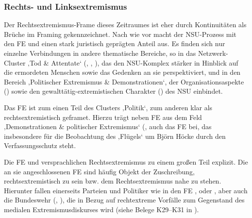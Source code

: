 \subsubsection{Rechts- und Linksextremismus}\label{rechts--und-linksextremismus-6}

Der Rechtsextremismus-Frame dieses Zeitraumes ist eher durch Kontinuitäten als Brüche im Framing gekennzeichnet. Nach wie vor macht der NSU-Prozess mit den FE  und  einen stark juristisch geprägten Anteil aus. Es finden sich nur einzelne Verbindungen in andere thematische Bereiche, so in das Netzwerk-Cluster ‚Tod \& Attentate` (, , ), das den NSU-Komplex stärker in Hinblick auf die ermordeten Menschen sowie das Gedenken an sie perspektiviert, und in den Bereich ‚Politischer Extremismus \& Demonstrationen`, der Organisationsaspekte () sowie den gewalttätig-extremistischen Charakter () des NSU einbindet.

Das FE  ist zum einen Teil des Clusters ‚Politik`, zum anderen klar als rechtsextremistisch geframet. Hierzu trägt neben FE aus dem Feld ‚Demonstrationen \& politischer Extremismus` (,  auch das FE  bei, das insbesondere für die Beobachtung des ‚Flügels` um Björn Höcke durch den Verfassungsschutz steht.

Die FE  und  versprachlichen Rechtsextremismus zu einem großen Teil explizit. Die an sie angeschlossenen FE sind häufig Objekt der Zuschreibung, rechtsextremistisch zu sein bzw. dem Rechtsextremismus nahe zu stehen. Hierunter fallen einerseits Parteien und Politiker wie in den FE ,  oder , aber auch die Bundeswehr (, ), die in Bezug auf rechtextreme Vorfälle zum Gegenstand des medialen Extremismusdiskurses wird (siehe Belege K29--K31 in ).

